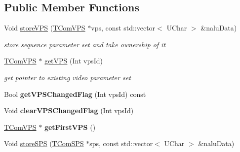 \subsection*{Public Member Functions}
\begin{DoxyCompactItemize}
\item 
\mbox{\label{class_parameter_set_manager_a7ef2a34a8f0c99e06464835805b1bf09}} 
Void \hyperlink{class_parameter_set_manager_a7ef2a34a8f0c99e06464835805b1bf09}{store\+V\+PS} (\hyperlink{class_t_com_v_p_s}{T\+Com\+V\+PS} $\ast$vps, const std\+::vector$<$ U\+Char $>$ \&nalu\+Data)
\begin{DoxyCompactList}\small\item\em store sequence parameter set and take ownership of it \end{DoxyCompactList}\item 
\mbox{\label{class_parameter_set_manager_a0c1062f78b2d8c5761ac770fd2dbb9f9}} 
\hyperlink{class_t_com_v_p_s}{T\+Com\+V\+PS} $\ast$ \hyperlink{class_parameter_set_manager_a0c1062f78b2d8c5761ac770fd2dbb9f9}{get\+V\+PS} (Int vps\+Id)
\begin{DoxyCompactList}\small\item\em get pointer to existing video parameter set \end{DoxyCompactList}\item 
\mbox{\label{class_parameter_set_manager_abf293fdfc0161f1ada16790776db3911}} 
Bool {\bfseries get\+V\+P\+S\+Changed\+Flag} (Int vps\+Id) const
\item 
\mbox{\label{class_parameter_set_manager_a9b3d5a49cb893f99eb8f7041511fdcbf}} 
Void {\bfseries clear\+V\+P\+S\+Changed\+Flag} (Int vps\+Id)
\item 
\mbox{\label{class_parameter_set_manager_a14ab75cc8e418e0d67ee1e5edff1808e}} 
\hyperlink{class_t_com_v_p_s}{T\+Com\+V\+PS} $\ast$ {\bfseries get\+First\+V\+PS} ()
\item 
\mbox{\label{class_parameter_set_manager_a2a776fec1bfb76da73c6af4eaaedbd91}} 
Void \hyperlink{class_parameter_set_manager_a2a776fec1bfb76da73c6af4eaaedbd91}{store\+S\+PS} (\hyperlink{class_t_com_s_p_s}{T\+Com\+S\+PS} $\ast$sps, const std\+::vector$<$ U\+Char $>$ \&nalu\+Data)

\end{DoxyCompactItemize}
